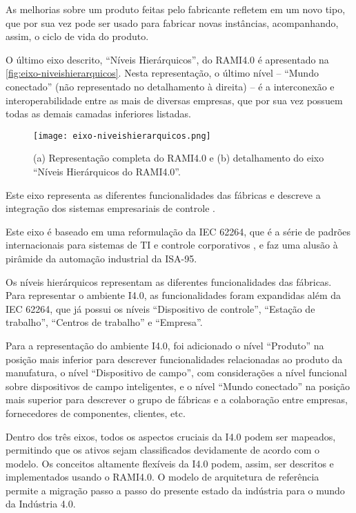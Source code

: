As melhorias sobre um produto feitas pelo fabricante refletem em um novo tipo, que por sua vez pode ser usado para fabricar novas instâncias, acompanhando, assim, o ciclo de vida do produto.

O último eixo descrito, ``Níveis Hierárquicos'', do RAMI4.0 é apresentado na \autoref{fig:eixo-niveishierarquicos}. Nesta representação, o último nível -- ``Mundo conectado'' (não representado no detalhamento à direita) -- é a interconexão e interoperabilidade entre as mais de diversas empresas, que por sua vez possuem todas as demais camadas inferiores listadas.

\begin{figure}[htb]
	\centering
	\texttt{[image: eixo-niveishierarquicos.png]}
	\caption{(a) Representação completa do RAMI4.0 e (b) detalhamento do eixo ``Níveis Hierárquicos do RAMI4.0''.}
	\label{fig:eixo-niveishierarquicos}
\end{figure}

Este eixo representa as diferentes funcionalidades das fábricas e descreve a integração dos sistemas empresariais de controle \cite{pisching2018arquitetura}.

Este eixo é baseado em uma reformulação da IEC 62264, que é a série de padrões internacionais para sistemas de TI e controle corporativos \cite{hankel2015rami}, e faz uma alusão à pirâmide da automação industrial da ISA-95.

Os níveis hierárquicos representam as diferentes funcionalidades das fábricas. Para representar o ambiente I4.0, as funcionalidades foram expandidas além da IEC 62264, que já possui os níveis ``Dispositivo de controle'', ``Estação de trabalho'', ``Centros de trabalho'' e ``Empresa''.

Para a representação do ambiente I4.0, foi adicionado o nível ``Produto'' na posição mais inferior para descrever funcionalidades relacionadas ao produto da manufatura, o nível ``Dispositivo de campo'', com considerações a nível funcional sobre dispositivos de campo inteligentes, e o nível ``Mundo conectado'' na posição mais superior para descrever o grupo de fábricas e a colaboração entre empresas, fornecedores de componentes, clientes, etc.

Dentro dos três eixos, todos os aspectos cruciais da I4.0 podem ser mapeados, permitindo que os ativos sejam classificados devidamente de acordo com o modelo. Os conceitos altamente flexíveis da I4.0 podem, assim, ser descritos e implementados usando o RAMI4.0. O modelo de arquitetura de referência permite a migração passo a passo do presente estado da indústria para o mundo da Indústria 4.0.

